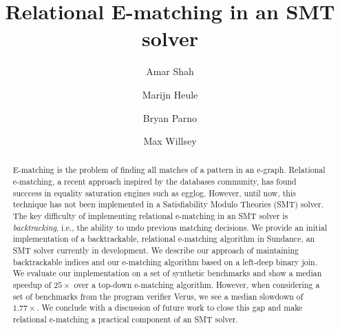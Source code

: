 \documentclass[sigplan,screen,review,natbib=true]{acmart}
\begin{document}
\title{Relational E-matching in an SMT solver}

\author{Amar Shah}

\author{Marijn Heule}

\author{Bryan Parno}

\author{Max Willsey}


\begin{abstract}
E-matching is the problem of finding all matches of a pattern in an e-graph.
Relational e-matching, a recent approach inspired by the databases community,
has found succcess in equality saturation engines such as egglog. However, until
now, this technique has not been implemented in a Satisfiability Modulo Theories
(SMT) solver. The key difficulty of implementing relational e-matching in an SMT
solver is \emph{backtracking}, i.e., the ability to undo previous matching
decisions. We provide an initial implementation of a backtrackable, relational
e-matching algorithm in Sundance, an SMT solver currently in development. We
describe our approach of maintaining backtrackable indices and our e-matching
algorithm based on a left-deep binary join. We evaluate our implementation on a
set of synthetic benchmarks and show a median speedup of $25 \times$ over a
top-down e-matching algorithm. However, when considering a set of
benchmarks from the program verifier Verus, we see a median slowdown of $1.77
\times$. We conclude with a discussion of future work to close this gap and make
relational e-matching a practical component of an SMT solver.
\end{abstract}



\maketitle










\end{document}
